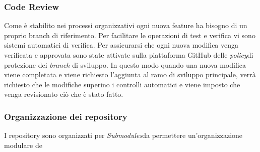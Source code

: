\subsubsection{Code Review}
Come è stabilito nei processi organizzativi ogni nuova feature ha bisogno di un
proprio branch di riferimento.
Per facilitare le operazioni di test e verifica vi sono sistemi automatici di verifica.
Per assicurarsi che ogni nuova modifica venga verificata e approvata sono state attivate
sulla piattaforma GitHub delle \textit{policy}\glo di protezione dei \textit{branch}\glo
di sviluppo.
In questo modo quando una nuova modifica viene completata e viene richiesto l'aggiunta
al ramo di sviluppo principale, verrà richiesto che le modifiche superino i controlli automatici
e viene imposto che venga revisionato ciò che è stato fatto.

\subsubsection{Organizzazione dei repository}
I repository sono organizzati per \textit{Submodules}\glo da permettere un'organizzazione
modulare de

